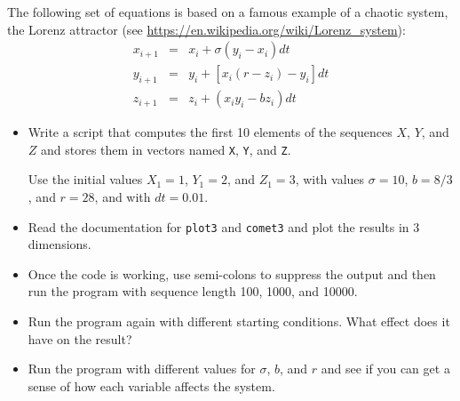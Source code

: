 \begin{ex}
  The following set of equations is based on a famous example of a chaotic system, the Lorenz attractor (see \url{https://en.wikipedia.org/wiki/Lorenz_system}):
%
\begin{eqnarray}
x_{i+1} &=& x_i + \sigma \left( y_i - x_i \right) dt  \\
y_{i+1} &=& y_i + \left[ x_i (r - z_i) - y_i \right] dt   \\
z_{i+1} &=& z_i + \left( x_i y_i - b z_i \right) dt
\end{eqnarray}
%
\begin{itemize}

\item Write a script that computes the first 10 elements of the sequences
$X$, $Y$, and $Z$ and stores them in vectors named {\tt X}, {\tt Y},
and {\tt Z}.

Use the initial values $X_1 = 1$, $Y_1 = 2$, and $Z_1 = 3$, with values
$\sigma = 10$, $b = 8/3$, and $r = 28$, and with $dt = 0.01$.

\item Read the documentation for {\tt plot3} and {\tt comet3} and
plot the results in 3 dimensions.

\item Once the code is working, use semi-colons to suppress the output
and then run the program with sequence length 100, 1000, and 10000.

\item Run the program again with different starting conditions.
What effect does it have on the result?

\item Run the program with different values for $\sigma$, $b$, and $r$
and see if you can get a sense of how each variable affects the
system.

\end{itemize}

\end{ex}


